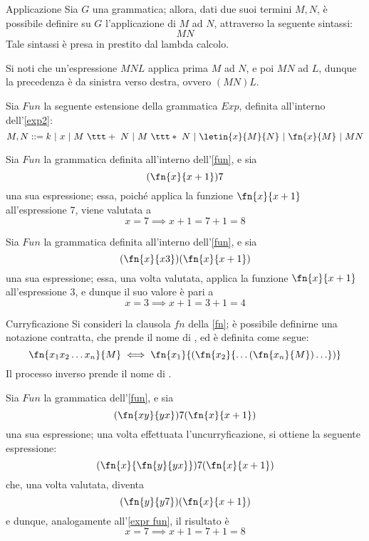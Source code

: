 \documentclass[a4paper, 12pt]{report}
\begin{document}
    \begin{frameddefn}{Applicazione}
        Sia $G$ una grammatica; allora, dati due suoi termini $M,N$, è possibile definire su $G$ l'applicazione di $M$ ad $N$, attraverso la seguente sintassi: $$MN$$ Tale sintassi è presa in prestito dal lambda calcolo.

        Si noti che un'espressione $MNL$ applica prima $M$ ad $N$, e poi $MN$ ad $L$, dunque la precedenza è da sinistra verso destra, ovvero $(MN)L$.
    \end{frameddefn}

    \begin{example}
        \label{fun}
        Sia $Fun$ la seguente estensione della grammatica $Exp$, definita all'interno dell'\cref{exp2}: $$M,N ::= k \ | \ x \ | \ M \ \ttt + \ N \ | \ M \ \ttt * \ N \ | \ \letin{x}{M}{N} \ | \ \fn{x}{M} \ | \ MN$$
    \end{example}

    \begin{example}
        Sia $Fun$ la grammatica definita all'interno dell'\cref{fun}, e sia $$(\fn{x}{x +1})7$$ una sua espressione; essa, poiché applica la funzione $\fn{x}{x+1}$ all'espressione 7, viene valutata a $$x = 7 \implies x + 1= 7 + 1 = 8$$
    \end{example}

    \begin{example}
        \label{expr fun}
        Sia $Fun$ la grammatica definita all'interno dell'\cref{fun}, e sia $$(\fn{x}{x3})(\fn{x}{x+1})$$ una sua espressione; essa, una volta valutata, applica la funzione $\fn{x}{x+1}$ all'espressione 3, e dunque il suo valore è pari a $$x = 3 \implies x + 1 = 3 + 1 = 4$$
    \end{example}

    \begin{frameddefn}{Curryficazione}
        Si consideri la clausola $fn$ della \cref{fn}; è possibile definirne una notazione contratta, che prende il nome di , ed è definita come segue: $$\fn{x_1x_2 \ldots x_n}{M} \iff \fn{x_1}{(\fn{x_2}{\ldots (\fn{x_n}{M}) \ldots})}$$ Il processo inverso prende il nome di .
    \end{frameddefn}

    \begin{example}[Curryficazioni]
        Sia $Fun$ la grammatica dell'\cref{fun}, e sia $$(\fn{xy}{yx})7(\fn{x}{x+1})$$ una sua espressione; una volta effettuata l'uncurryficazione, si ottiene la seguente espressione: $$(\fn{x}{\fn{y}{yx}})7(\fn{x}{x+1})$$ che, una volta valutata, diventa $$(\fn{y}{y7})(\fn{x}{x+1})$$ e dunque, analogamente all'\cref{expr fun}, il risultato è $$x= 7 \implies x+1 = 7 + 1= 8$$
    \end{example}
\end{document}
